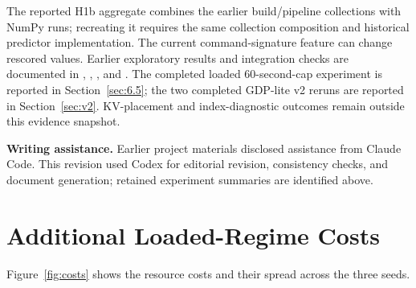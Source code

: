 \documentclass[11pt,a4paper]{article}
\begin{document}
The reported H1b aggregate combines the earlier build/pipeline collections with NumPy runs; recreating it requires the same collection composition and historical predictor implementation. The current command-signature feature can change rescored values. Earlier exploratory results and integration checks are documented in , , , and . The completed loaded 60-second-cap experiment is reported in Section~\ref{sec:6.5}; the two completed GDP-lite v2 reruns are reported in Section~\ref{sec:v2}. KV-placement and index-diagnostic outcomes remain outside this evidence snapshot.


\textbf{Writing assistance.} Earlier project materials disclosed assistance from Claude Code. This revision used Codex for editorial revision, consistency checks, and document generation; retained experiment summaries are identified above.


\section{Additional Loaded-Regime Costs}
\label{app:B}

Figure~\ref{fig:costs} shows the resource costs and their spread across the three seeds.
\end{document}
